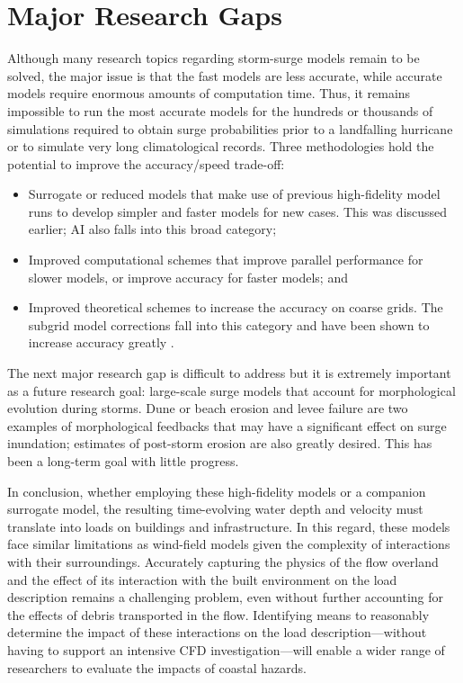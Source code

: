 \section{Major Research Gaps}
\label{sec:storm_surge_gaps}

Although many research topics regarding storm-surge models remain to be solved, the major issue is that the fast models are less accurate, while accurate models require enormous amounts of computation time. Thus, it remains impossible to run the most accurate models for the hundreds or thousands of simulations required to obtain surge probabilities prior to a landfalling hurricane or to simulate very long climatological records. Three methodologies hold the potential to improve the accuracy/speed trade-off:

\begin{itemize}
    \item Surrogate or reduced models that make use of previous high-fidelity model runs to develop simpler and faster models for new cases. This was discussed earlier; AI also falls into this broad category;

    \item Improved computational schemes that improve parallel performance for slower models, or improve accuracy for faster models; and

    \item Improved theoretical schemes to increase the accuracy on coarse grids. The subgrid model corrections fall into this category and have been shown to increase accuracy greatly \citep{kennedy2019subgrid}.
\end{itemize}

The next major research gap is difficult to address but it is extremely important as a future research goal: large-scale surge models that account for morphological evolution during storms. Dune or beach erosion and levee failure are two examples of morphological feedbacks that may have a significant effect on surge inundation; estimates of post-storm erosion are also greatly desired. This has been a long-term goal with little progress.

In conclusion, whether employing these high-fidelity models or a companion surrogate model, the resulting time-evolving water depth and velocity must translate into loads on buildings and infrastructure. In this regard, these models face similar limitations as wind-field models given the complexity of interactions with their surroundings. Accurately capturing the physics of the flow overland and the effect of its interaction with the built environment on the load description remains a challenging problem, even without further accounting for the effects of debris transported in the flow. Identifying means to reasonably determine the impact of these interactions on the load description---without having to support an intensive CFD investigation---will enable a wider range of researchers to evaluate the impacts of coastal hazards. 


